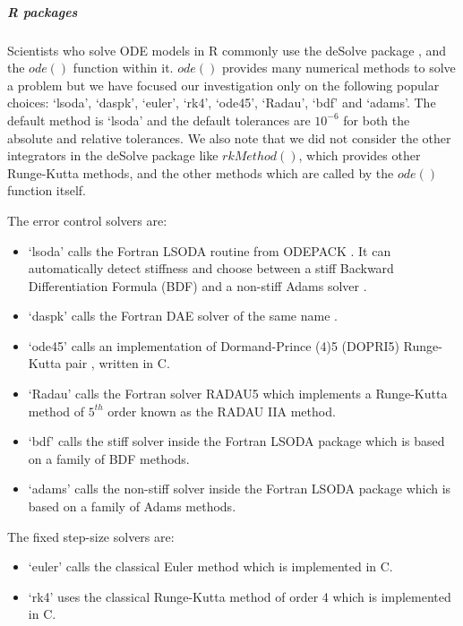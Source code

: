 \subparagraph{R packages}
Scientists who solve ODE models in R commonly use the deSolve package \cite{soetaert2010solving}, and the $ode()$ function within it.
$ode()$ provides many numerical methods to solve a problem but we have focused our investigation only on the following popular choices: `lsoda', `daspk', `euler', `rk4', `ode45', `Radau', `bdf' and `adams'. The default method is `lsoda' and the default tolerances are $10^{-6}$ for both the absolute and relative tolerances. We also note that we did not consider the other integrators in the deSolve package like $rkMethod()$, which provides other Runge-Kutta methods, and the other methods which are called by the $ode()$ function itself.

The error control solvers are:
\begin{itemize}
\item `lsoda' calls the Fortran LSODA routine from ODEPACK \cite{MR751604}. It can automatically detect stiffness and choose between a stiff Backward Differentiation Formula (BDF) \cite{MR3822086} and a non-stiff Adams solver \cite{MR3822086}.

\item `daspk' calls the Fortran DAE solver of the same name \cite{MR1379682}.

\item `ode45' calls an implementation of Dormand-Prince (4)5 (DOPRI5) Runge-Kutta pair \cite{MR3822086}, written in C.

\item `Radau' calls the Fortran solver RADAU5 \cite{MR1439506} which implements a Runge-Kutta method of $5^{th}$ order known as the RADAU IIA method.

\item `bdf' calls the stiff solver inside the Fortran LSODA package which is based on a family of BDF methods.

\item `adams' calls the non-stiff solver inside the Fortran LSODA package which is based on a family of Adams methods.
\end{itemize}

The fixed step-size solvers are:
\begin{itemize}
\item `euler' calls the classical Euler method which is implemented in C.
\item `rk4' uses the classical Runge-Kutta method of order 4 which is implemented in C. 
\end{itemize}

